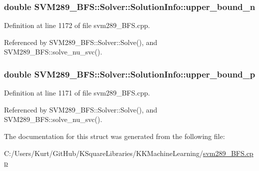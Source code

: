 \subsubsection[{\texorpdfstring{upper\+\_\+bound\+\_\+n}{upper_bound_n}}]{\setlength{\rightskip}{0pt plus 5cm}double S\+V\+M289\+\_\+\+B\+F\+S\+::\+Solver\+::\+Solution\+Info\+::upper\+\_\+bound\+\_\+n}\hypertarget{struct_s_v_m289___b_f_s_1_1_solver_1_1_solution_info_aacda21688b31ff854b0e17ae458f6d42}{}\label{struct_s_v_m289___b_f_s_1_1_solver_1_1_solution_info_aacda21688b31ff854b0e17ae458f6d42}


Definition at line 1172 of file svm289\+\_\+\+B\+F\+S.\+cpp.



Referenced by S\+V\+M289\+\_\+\+B\+F\+S\+::\+Solver\+::\+Solve(), and S\+V\+M289\+\_\+\+B\+F\+S\+::solve\+\_\+nu\+\_\+svc().

\subsubsection[{\texorpdfstring{upper\+\_\+bound\+\_\+p}{upper_bound_p}}]{\setlength{\rightskip}{0pt plus 5cm}double S\+V\+M289\+\_\+\+B\+F\+S\+::\+Solver\+::\+Solution\+Info\+::upper\+\_\+bound\+\_\+p}\hypertarget{struct_s_v_m289___b_f_s_1_1_solver_1_1_solution_info_a06cbde68d648800d92969dd4509050fe}{}\label{struct_s_v_m289___b_f_s_1_1_solver_1_1_solution_info_a06cbde68d648800d92969dd4509050fe}


Definition at line 1171 of file svm289\+\_\+\+B\+F\+S.\+cpp.



Referenced by S\+V\+M289\+\_\+\+B\+F\+S\+::\+Solver\+::\+Solve(), and S\+V\+M289\+\_\+\+B\+F\+S\+::solve\+\_\+nu\+\_\+svc().



The documentation for this struct was generated from the following file\+:\begin{DoxyCompactItemize}
\item 
C\+:/\+Users/\+Kurt/\+Git\+Hub/\+K\+Square\+Libraries/\+K\+K\+Machine\+Learning/\hyperlink{svm289___b_f_s_8cpp}{svm289\+\_\+\+B\+F\+S.\+cpp}\end{DoxyCompactItemize}
